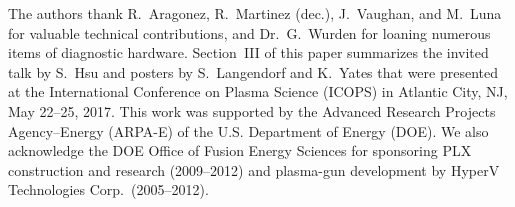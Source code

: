 \documentclass[journal]{IEEEtran}
\begin{document}
The authors thank R.~Aragonez, R.~Martinez (dec.), J.~Vaughan, and M.~Luna for valuable
technical contributions,
and Dr.~G.~Wurden for loaning numerous items of diagnostic hardware.
Section~III of this paper summarizes
the invited talk by S.~Hsu and posters by S.~Langendorf and K.~Yates that were presented at
the International Conference on Plasma Science (ICOPS) in Atlantic City, NJ, May 22--25, 2017.
This work was supported by the Advanced Research Projects Agency--Energy (ARPA-E) of the
U.S. Department of Energy (DOE)\@.  We also
acknowledge the DOE Office of Fusion Energy Sciences for
sponsoring PLX construction and research (2009--2012) and plasma-gun development
by HyperV Technologies Corp.\ (2005--2012).


\ifCLASSOPTIONcaptionsoff
  \newpage
\fi





%
%
%


\end{document}
